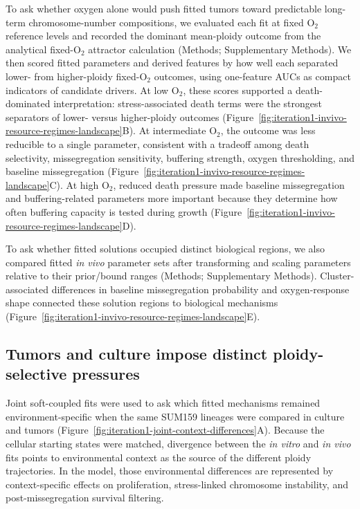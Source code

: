 \documentclass[11pt]{article}
\begin{document}
To ask whether oxygen alone would push fitted tumors toward predictable long-term chromosome-number compositions, we evaluated each fit at fixed O$_2$ reference levels and recorded the dominant mean-ploidy outcome from the analytical fixed-O$_2$ attractor calculation (Methods; Supplementary Methods). We then scored fitted parameters and derived features by how well each separated lower- from higher-ploidy fixed-O$_2$ outcomes, using one-feature AUCs as compact indicators of candidate drivers. At low O$_2$, these scores supported a death-dominated interpretation: stress-associated death terms were the strongest separators of lower- versus higher-ploidy outcomes (Figure~\ref{fig:iteration1-invivo-resource-regimes-landscape}B). At intermediate O$_2$, the outcome was less reducible to a single parameter, consistent with a tradeoff among death selectivity, missegregation sensitivity, buffering strength, oxygen thresholding, and baseline missegregation (Figure~\ref{fig:iteration1-invivo-resource-regimes-landscape}C). At high O$_2$, reduced death pressure made baseline missegregation and buffering-related parameters more important because they determine how often buffering capacity is tested during growth (Figure~\ref{fig:iteration1-invivo-resource-regimes-landscape}D).

To ask whether fitted solutions occupied distinct biological regions, we also compared fitted \textit{in vivo} parameter sets after transforming and scaling parameters relative to their prior/bound ranges (Methods; Supplementary Methods). Cluster-associated differences in baseline missegregation probability and oxygen-response shape connected these solution regions to biological mechanisms (Figure~\ref{fig:iteration1-invivo-resource-regimes-landscape}E).

\subsection*{Tumors and culture impose distinct ploidy-selective pressures}

Joint soft-coupled fits were used to ask which fitted mechanisms remained environment-specific when the same SUM159 lineages were compared in culture and tumors (Figure~\ref{fig:iteration1-joint-context-differences}A). Because the cellular starting states were matched, divergence between the \textit{in vitro} and \textit{in vivo} fits points to environmental context as the source of the different ploidy trajectories. In the model, those environmental differences are represented by context-specific effects on proliferation, stress-linked chromosome instability, and post-missegregation survival filtering.
\end{document}
